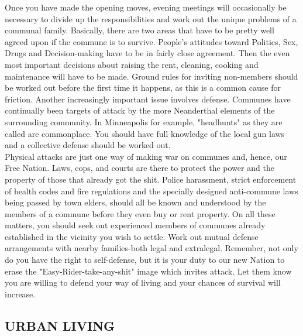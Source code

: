 \documentclass[11pt,twoside,a4paper]{book}
\begin{document}
Once you have made the opening moves, evening meetings will occasionally be necessary to divide up the responsibilities and work out the unique problems of a communal family. Basically, there are two areas that have to be pretty well agreed upon if the commune is to survive. People's attitudes toward Politics, Sex, Drugs and Decision-making have to be in fairly close agreement. Then the even most important decisions about raising the rent, cleaning, cooking and maintenance will have to be made. Ground rules for inviting non-members should be worked out before the first time it happens, as this is a common cause for friction. Another increasingly important issue involves defense. Communes have continually been targets of attack by the more Neanderthal elements of the surrounding community. In Minneapolis for example, "headhunts" as they are called are commonplace. You should have full knowledge of the local gun laws and a collective defense should be worked out.~\\

Physical attacks are just one way of making war on communes and, hence, our Free Nation. Laws, cops, and courts are there to protect the power and the property of those that already got the shit. Police harassment, strict enforcement of health codes and fire regulations and the specially designed anti-commune laws being passed by town elders, should all be known and understood by the members of a commune before they even buy or rent property. On all these matters, you should seek out experienced members of communes already established in the vicinity you wish to settle. Work out mutual defense arrangements with nearby families-both legal and extralegal. Remember, not only do you have the right to self-defense, but it is your duty to our new Nation to erase the "Easy-Rider-take-any-shit" image which invites attack. Let them know you are willing to defend your way of living and your chances of survival will increase.

\subsection{URBAN LIVING}
\end{document}
